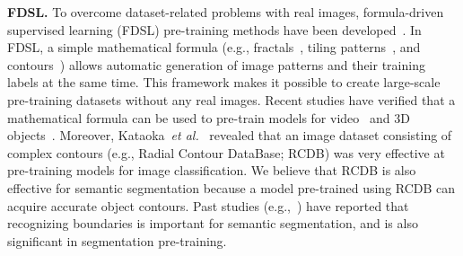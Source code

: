 \documentclass[10pt,twocolumn,letterpaper]{article}
\begin{document}
\noindent \textbf{FDSL.} 
To overcome dataset-related problems with real images, formula-driven supervised learning (FDSL) pre-training methods have been developed~\cite{Kataoka_2022_IJCV}.
In FDSL, a simple mathematical formula (e.g., fractals~\cite{Kataoka_2022_IJCV,anderson2022improving,nakashima2022can,Kataoka_2022_CVPR}, tiling patterns~\cite{kataoka2021formula}, and contours~\cite{Kataoka_2022_CVPR}) allows automatic generation of image patterns and their training labels at the same time.
This framework makes it possible to create large-scale pre-training datasets without any real images. Recent studies have verified that a mathematical formula can be used to pre-train models for video~\cite{kataoka2022stinitialization} and 3D objects~\cite{yamada2021iros,yamada2022point}.
Moreover, Kataoka~\textit{et al.}~\cite{Kataoka_2022_CVPR} revealed that an image dataset consisting of complex contours (e.g., Radial Contour DataBase; RCDB) was very effective at pre-training models for image classification.
We believe that RCDB is also effective for semantic segmentation because a model pre-trained using RCDB can acquire accurate object contours.
Past studies (e.g.,~\cite{Bertasius2016ssboundary,takikawa2019gatedscnn}) have reported that recognizing boundaries is important for semantic segmentation, and is also significant in segmentation pre-training.


\def\figB{
\begin{figure}
\centering
\texttt{[image: figB.pdf]}
\caption{{\bf Radial contours.} An image $\bm{x}_{i}$ is composed of multiple radial contours. The radial contours $\mathcal{R}_{j}$ are placed at positions $\bm{p}_{j}$. Each radial contour is an object made by superimposing polygons $\{P_{k}\}_{k=1}^{K}$.}
\label{figB}
\vspace{-15pt}
\end{figure}
}

\def\figC{
\begin{figure*}
\centering
\texttt{[image: figC.pdf]}
\vspace{-10pt}
\caption{{\bf Examples of images used in the investigation.}}
\label{figC}
\vspace{-15pt}
\end{figure*}
}
\end{document}

